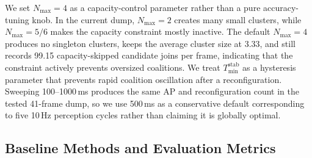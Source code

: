 \documentclass[conference]{IEEEtran}
\begin{document}
We set $N_{\max}=4$ as a capacity-control parameter rather than a pure accuracy-tuning knob. In the current dump, $N_{\max}=2$ creates many small clusters, while $N_{\max}=5/6$ makes the capacity constraint mostly inactive. The default $N_{\max}=4$ produces no singleton clusters, keeps the average cluster size at 3.33, and still records 99.15 capacity-skipped candidate joins per frame, indicating that the constraint actively prevents oversized coalitions. We treat $T_{\min}^{\mathrm{stab}}$ as a hysteresis parameter that prevents rapid coalition oscillation after a reconfiguration. Sweeping 100--1000\,ms produces the same AP and reconfiguration count in the tested 41-frame dump, so we use 500\,ms as a conservative default corresponding to five 10\,Hz perception cycles rather than claiming it is globally optimal.


\subsection{Baseline Methods and Evaluation Metrics}
\end{document}
